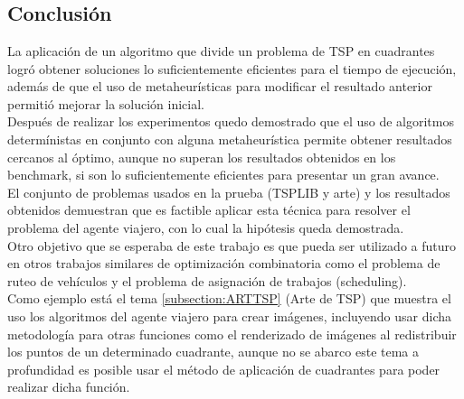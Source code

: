 \chapter{}
    \vspace*{10cm}
    \begin{center}
        \section*{Conclusión}
        \addtocounter{section}{1}
        \setcounter{subsection}{0}
        \setcounter{figure}{0}
        \setcounter{lstlisting}{0}
        \setcounter{table}{0} 
    \end{center}
    
    \clearpage \newpage
    \vspace*{8cm}
    
La aplicación de un algoritmo que divide un problema de TSP en cuadrantes logró obtener soluciones lo suficientemente eficientes para el tiempo de ejecución, además de que el uso de metaheurísticas para modificar el resultado anterior permitió mejorar la solución inicial.\\
\hspace*{1cm}Después de realizar los experimentos quedo demostrado que el uso de algoritmos determínistas en conjunto con alguna metaheurística permite obtener resultados cercanos al óptimo, aunque no superan los resultados obtenidos en los benchmark, si son lo suficientemente eficientes para presentar un gran avance.\\
\hspace*{1cm}El conjunto de problemas usados en la prueba (TSPLIB y arte) y los resultados obtenidos demuestran que es factible aplicar esta técnica para resolver el problema del agente viajero, con lo cual la hipótesis queda demostrada.\\
\hspace*{1cm}Otro objetivo que se esperaba de este trabajo es que pueda ser utilizado a futuro en otros trabajos similares de optimización combinatoria como el problema de ruteo de vehículos y el problema de asignación de trabajos (scheduling).\\
\hspace*{1cm}Como ejemplo está el tema \ref{subsection:ARTTSP} (Arte de TSP) que muestra el uso los algoritmos del agente viajero para crear imágenes, incluyendo usar dicha metodología para otras funciones como el renderizado de imágenes al redistribuir los puntos de un determinado cuadrante, aunque no se abarco este tema a profundidad es posible usar el método de aplicación de cuadrantes para poder realizar dicha función.\\
\newpage

